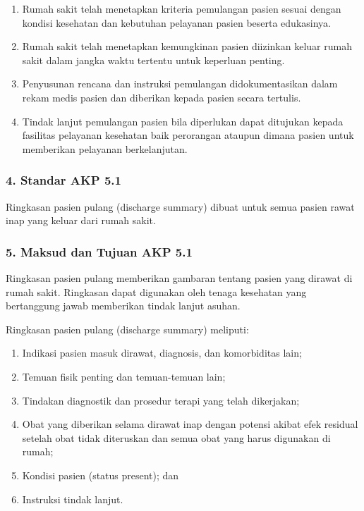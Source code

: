 \documentclass[
]{book}
\providecommand{\tightlist}{%
  \setlength{\itemsep}{0pt}\setlength{\parskip}{0pt}}
\begin{document}
\begin{enumerate}
\def\labelenumi{\alph{enumi}.}
\tightlist
\item
  Rumah sakit telah menetapkan kriteria pemulangan pasien sesuai dengan kondisi kesehatan dan kebutuhan pelayanan pasien beserta edukasinya.
\item
  Rumah sakit telah menetapkan kemungkinan pasien diizinkan keluar rumah sakit dalam jangka waktu tertentu untuk keperluan penting.
\item
  Penyusunan rencana dan instruksi pemulangan didokumentasikan dalam rekam medis pasien dan diberikan kepada pasien secara tertulis.
\item
  Tindak lanjut pemulangan pasien bila diperlukan dapat ditujukan kepada fasilitas pelayanan kesehatan baik perorangan ataupun dimana pasien untuk memberikan pelayanan berkelanjutan.
\end{enumerate}

\hypertarget{standar-akp-5.1}{%
\subsubsection*{4. Standar AKP 5.1}\label{standar-akp-5.1}}

Ringkasan pasien pulang (discharge summary) dibuat untuk semua pasien rawat inap yang keluar dari rumah sakit.

\hypertarget{maksud-dan-tujuan-akp-5.1}{%
\subsubsection*{5. Maksud dan Tujuan AKP 5.1}\label{maksud-dan-tujuan-akp-5.1}}

Ringkasan pasien pulang memberikan gambaran tentang pasien yang dirawat di rumah sakit. Ringkasan dapat digunakan oleh tenaga kesehatan yang bertanggung jawab memberikan tindak lanjut asuhan.

Ringkasan pasien pulang (discharge summary) meliputi:

\begin{enumerate}
\def\labelenumi{\alph{enumi}.}
\tightlist
\item
  Indikasi pasien masuk dirawat, diagnosis, dan komorbiditas lain;
\item
  Temuan fisik penting dan temuan-temuan lain;
\item
  Tindakan diagnostik dan prosedur terapi yang telah dikerjakan;
\item
  Obat yang diberikan selama dirawat inap dengan potensi akibat efek residual setelah obat tidak diteruskan dan semua obat yang harus digunakan di rumah;
\item
  Kondisi pasien (status present); dan
\item
  Instruksi tindak lanjut.
\end{enumerate}
\end{document}
